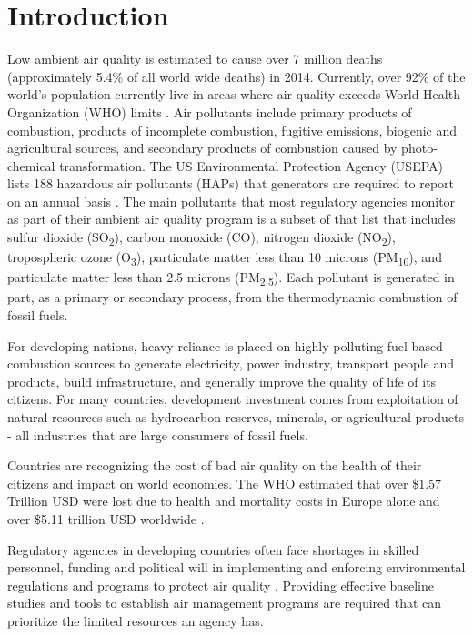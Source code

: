 \chapter{Introduction}

Low ambient air quality is estimated to cause over 7 million deaths (approximately 5.4\% of all world wide deaths) in 2014. Currently, over 92\% of the world's population currently live in areas where air quality exceeds World Health Organization (WHO) limits \cite{WHO2016}. Air pollutants include primary products of combustion, products of incomplete combustion, fugitive emissions, biogenic and agricultural sources, and secondary products of combustion caused by photo-chemical transformation. The US Environmental Protection Agency (USEPA) lists 188 hazardous air pollutants (HAPs) that generators are required to report on an annual basis \cite{USEPA1996}. The main pollutants that most regulatory agencies monitor as part of their ambient air quality program is a subset of that list that includes sulfur dioxide (SO\textsubscript{2}), carbon monoxide (CO), nitrogen dioxide (NO\textsubscript{2}), tropospheric ozone (O\textsubscript{3}),  particulate matter less than 10 microns (PM\textsubscript{10}), and particulate matter less than 2.5 microns (PM\textsubscript{2.5}). Each pollutant is generated in part, as a primary or secondary process, from the thermodynamic combustion of fossil fuels.

For developing nations, heavy reliance is placed on highly polluting fuel-based combustion sources to generate electricity, power industry, transport people and products, build infrastructure, and generally improve the quality of life of its citizens. For many countries, development investment comes from exploitation of natural resources such as hydrocarbon reserves, minerals, or agricultural products - all industries that are large consumers of fossil fuels.

Countries are recognizing the cost of bad air quality on the health of their citizens and impact on world economies. The WHO estimated that over \$1.57 Trillion USD were lost due to health and mortality costs in Europe alone \cite{Roy2015} and over \$5.11 trillion USD worldwide \cite{Narain2016}.

Regulatory agencies in developing countries often face shortages in skilled personnel, funding and political will in implementing and enforcing environmental regulations and programs to protect air quality \cite{Freeman2015a}. Providing effective baseline studies and tools to establish air management programs are required that can prioritize the limited resources an agency has. 

